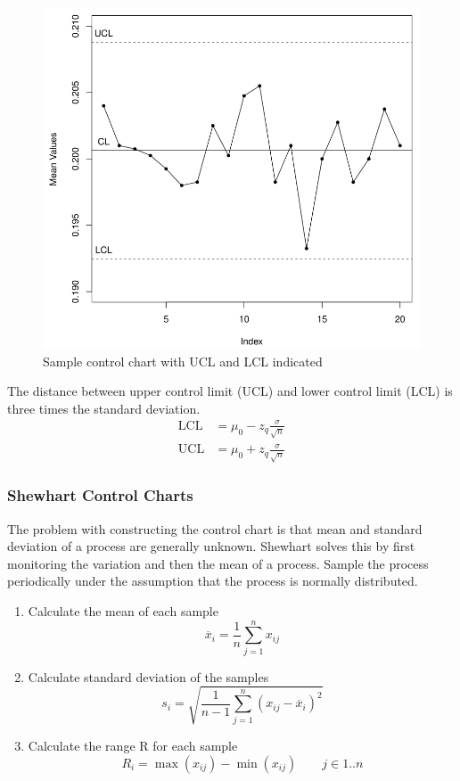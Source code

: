 \documentclass[11pt]{article}
\theoremstyle{definition}
\newcommand*\samplemean[1]{\overline{#1}}
\begin{document}
\begin{figure}[tbh]
	\centering
	\includegraphics[width=0.5\linewidth]{img/control_chart}
	\caption{Sample control chart with UCL and LCL indicated}
	\label{fig:controlchart}
\end{figure}

The distance between upper control limit (UCL) and lower control limit (LCL) is three times the standard deviation.
\begin{align*}
	\text{LCL} &= \mu_0 - z_q \frac{\sigma}{\sqrt{n}}\\
	\text{UCL} &= \mu_0 + z_q \frac{\sigma}{\sqrt{n}}
\end{align*}

\subsubsection{Shewhart Control Charts}
The problem with constructing the control chart is that mean and standard deviation of a process are generally unknown. Shewhart solves this by first monitoring the variation and then the mean of a process. Sample the process periodically under the assumption that the process is normally distributed.
\begin{enumerate}
	\item Calculate the mean of each sample
	\begin{equation*}
		\samplemean{x}_i = \frac{1}{n}\sum_{j=1}^{n}x_{ij}
	\end{equation*}
	\item Calculate standard deviation of the samples
	\begin{equation*}
		s_i = \sqrt{\frac{1}{n-1} \sum_{j=1}^{n}(x_{ij}-\samplemean{x}_i)^2}
	\end{equation*}
	\item Calculate the range R for each sample
	\begin{equation*}
		R_i = \max(x_{ij}) - \min(x_{ij}) \qquad j\in1..n
	\end{equation*}
\end{enumerate}
\end{document}
